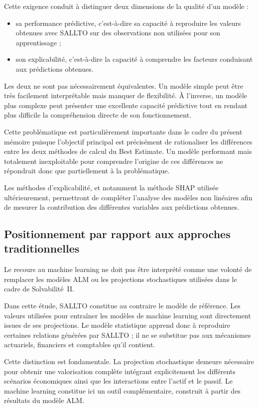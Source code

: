 Cette exigence conduit à distinguer deux dimensions de la qualité d'un modèle :

\begin{itemize}[noitemsep,topsep=2pt]
    \item sa performance prédictive, c'est-à-dire sa capacité à reproduire les valeurs obtenues avec SALLTO sur des observations non utilisées pour son apprentissage ;
    \item son explicabilité, c'est-à-dire la capacité à comprendre les facteurs conduisant aux prédictions obtenues.
\end{itemize}

Les deux ne sont pas nécessairement équivalentes. Un modèle simple peut être très facilement interprétable mais manquer de flexibilité. À l'inverse, un modèle plus complexe peut présenter une excellente capacité prédictive tout en rendant plus difficile la compréhension directe de son fonctionnement.

Cette problématique est particulièrement importante dans le cadre du présent mémoire puisque l'objectif principal est précisément de rationaliser les différences entre les deux méthodes de calcul du Best Estimate. Un modèle performant mais totalement inexploitable pour comprendre l'origine de ces différences ne répondrait donc que partiellement à la problématique.

Les méthodes d'explicabilité, et notamment la méthode SHAP utilisée ultérieurement, permettront de compléter l'analyse des modèles non linéaires afin de mesurer la contribution des différentes variables aux prédictions obtenues.


\subsection{Positionnement par rapport aux approches traditionnelles}

Le recours au machine learning ne doit pas être interprété comme une volonté de remplacer les modèles ALM ou les projections stochastiques utilisées dans le cadre de Solvabilité~II.

Dans cette étude, SALLTO constitue au contraire le modèle de référence. Les valeurs utilisées pour entraîner les modèles de machine learning sont directement issues de ses projections. Le modèle statistique apprend donc à reproduire certaines relations générées par SALLTO ; il ne se substitue pas aux mécanismes actuariels, financiers et comptables qu'il contient.

Cette distinction est fondamentale. La projection stochastique demeure nécessaire pour obtenir une valorisation complète intégrant explicitement les différents scénarios économiques ainsi que les interactions entre l'actif et le passif. Le machine learning constitue ici un outil complémentaire, construit à partir des résultats du modèle ALM.

